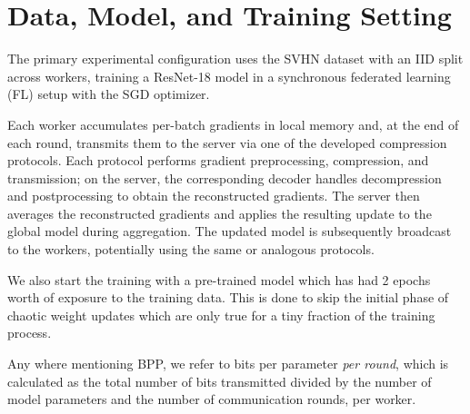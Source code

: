 \section{Data, Model, and Training Setting}

The primary experimental configuration uses the SVHN dataset with an IID split across workers, training a ResNet-18 model in a synchronous federated learning (FL) setup with the SGD optimizer.

Each worker accumulates per-batch gradients in local memory and, at the end of each round, transmits them to the server via one of the developed compression protocols. Each protocol performs gradient preprocessing, compression, and transmission; on the server, the corresponding decoder handles decompression and postprocessing to obtain the reconstructed gradients. The server then averages the reconstructed gradients and applies the resulting update to the global model during aggregation. The updated model is subsequently broadcast to the workers, potentially using the same or analogous protocols.

We also start the training with a pre-trained model which has had 2 epochs worth of exposure to the training data. This is done to skip the initial phase of chaotic weight updates which are only true for a tiny fraction of the training process.

Any where mentioning BPP, we refer to bits per parameter \emph{per round}, which is calculated as the total number of bits transmitted divided by the number of model parameters and the number of communication rounds, per worker.